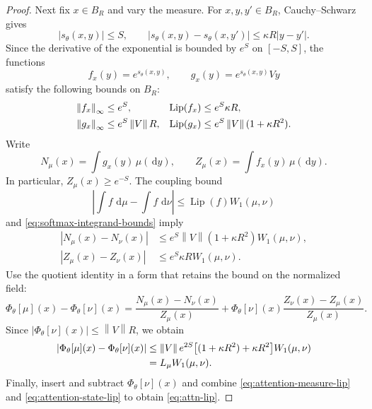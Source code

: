 \documentclass[11pt]{amsart}
\numberwithin{equation}{section}
\theoremstyle{plain}
\newcommand{\dd}{\,\mathrm{d}}
\newcommand{\abs}[1]{\left\lvert#1\right\rvert}
\newcommand{\norm}[1]{\left\lVert#1\right\rVert}
\DeclareMathOperator{\Lip}{Lip}
\begin{document}
\begin{proof}
Next fix $x\in B_R$ and vary the measure.
For $x,y,y'\in B_R$, Cauchy--Schwarz gives
\[
 \abs{s_\theta(x,y)}\leq S,
 \qquad
 \abs{s_\theta(x,y)-s_\theta(x,y')}
 \leq \kappa R\abs{y-y'}.
\]
Since the derivative of the exponential is bounded by $e^S$ on
$[-S,S]$, the functions
\[
 f_x(y)=e^{s_\theta(x,y)},
 \qquad g_x(y)=e^{s_\theta(x,y)}Vy
\]
satisfy the following bounds on $B_R$:
\begin{align}
 \norm{f_x}_\infty&\leq e^S,
 &\Lip(f_x)&\leq e^S\kappa R,\notag\\
 \norm{g_x}_\infty&\leq e^S\norm{V}R,
 &\Lip(g_x)&\leq e^S\norm{V}(1+\kappa R^2).
 \label{eq:softmax-integrand-bounds}
\end{align}
Write
\[
 N_\mu(x)=\int g_x(y)\,\mu(\dd y),
 \qquad Z_\mu(x)=\int f_x(y)\,\mu(\dd y).
\]
In particular, $Z_\mu(x)\geq e^{-S}$.  The coupling bound
\[
 \left|\int f\,\dd\mu-\int f\,\dd\nu\right|
 \leq\Lip(f)W_1(\mu,\nu)
\]
and \eqref{eq:softmax-integrand-bounds} imply
\begin{align*}
 \abs{N_\mu(x)-N_\nu(x)}
 &\leq e^S\norm{V}(1+\kappa R^2)W_1(\mu,\nu),\\
 \abs{Z_\mu(x)-Z_\nu(x)}
 &\leq e^S\kappa R W_1(\mu,\nu).
\end{align*}
Use the quotient identity in a form that retains the bound on the normalized
field:
\[
 \Phi_\theta[\mu](x)-\Phi_\theta[\nu](x)
 =\frac{N_\mu(x)-N_\nu(x)}{Z_\mu(x)}
  +\Phi_\theta[\nu](x)\frac{Z_\nu(x)-Z_\mu(x)}{Z_\mu(x)}.
\]
Since $\abs{\Phi_\theta[\nu](x)}\leq\norm V R$, we obtain
\begin{align}
 \abs{\Phi_\theta[\mu](x)-\Phi_\theta[\nu](x)}
 &\leq \norm V e^{2S}\bigl[(1+\kappa R^2)+\kappa R^2\bigr]
         W_1(\mu,\nu)\notag\\
 &=L_\mu W_1(\mu,\nu).
 \label{eq:attention-measure-lip}
\end{align}
Finally, insert and subtract $\Phi_\theta[\nu](x)$ and combine
\eqref{eq:attention-measure-lip} and \eqref{eq:attention-state-lip} to obtain
\eqref{eq:attn-lip}.
\end{proof}
\end{document}
